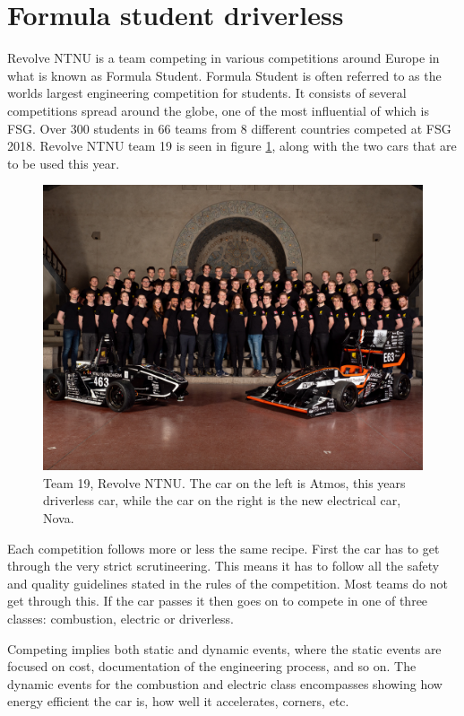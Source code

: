 \section{Formula student driverless}

Revolve NTNU is a team competing in various competitions around Europe in what is known as Formula Student. Formula Student is often referred to as the worlds largest engineering competition for students. It consists of several competitions spread around the globe, one of the most influential of which is \gls{FSG}. Over 300 students in 66 teams from 8 different countries competed at \gls{FSG} 2018. Revolve NTNU team 19 is seen in figure \ref{Fig:Team19}, along with the two cars that are to be used this year.

\begin{figure}
    \centering
    \includegraphics[width=\linewidth]{0_Images/2_Introduction/team19.jpg}
    \caption[Team 19, Revolve NTNU]{Team 19, Revolve NTNU. The car on the left is Atmos, this years driverless car, while the car on the right is the new electrical car, Nova.}
    \label{Fig:Team19}
\end{figure}

Each competition follows more or less the same recipe. First the car has to get through the very strict scrutineering. This means it has to follow all the safety and quality guidelines stated in the rules of the competition. Most teams do not get through this. If the car passes it then goes on to compete in one of three classes: combustion, electric or driverless. 

Competing implies both static and dynamic events, where the static events are focused on cost, documentation of the engineering process, and so on. The dynamic events for the combustion and electric class encompasses showing how energy efficient the car is, how well it accelerates, corners, etc. 

